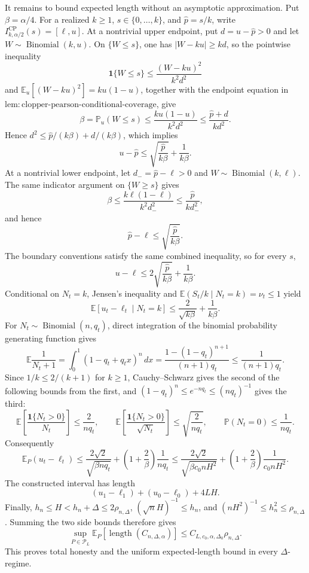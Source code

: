 It remains to bound expected length without an asymptotic approximation.  Put \(\beta=\alpha/4\).  For a realized \(k\geq1\), \(s\in\{0,\ldots,k\}\), and \(\widehat p=s/k\), write \(I^{\mathrm{CP}}_{k,\alpha/2}(s)=[\ell,u]\).  At a nontrivial upper endpoint, put \(d=u-\widehat p>0\) and let \(W\sim\operatorname{Binomial}(k,u)\).  On \(\{W\leq s\}\), one has \(|W-ku|\geq kd\), so the pointwise inequality
\[
 \mathbf1\{W\leq s\}\leq\frac{(W-ku)^2}{k^2d^2}
\]
and \(\mathbb E_u[(W-ku)^2]=ku(1-u)\), together with the endpoint equation in \(\mathrm{lem:clopper\text{-}pearson\text{-}conditional\text{-}coverage}\), give
\[
 \beta=\mathbb P_u(W\leq s)
 \leq\frac{ku(1-u)}{k^2d^2}
 \leq\frac{\widehat p+d}{kd^2}.
\]
Hence \(d^2\leq\widehat p/(k\beta)+d/(k\beta)\), which implies
\[
 u-\widehat p\leq\sqrt{\frac{\widehat p}{k\beta}}+\frac1{k\beta}.
\]
At a nontrivial lower endpoint, let \(d_-=\widehat p-\ell>0\) and \(W\sim\operatorname{Binomial}(k,\ell)\).  The same indicator argument on \(\{W\geq s\}\) gives
\[
 \beta\leq\frac{k\ell(1-\ell)}{k^2d_-^2}
 \leq\frac{\widehat p}{kd_-^2},
\]
and hence
\[
 \widehat p-\ell\leq\sqrt{\frac{\widehat p}{k\beta}}.
\]
The boundary conventions satisfy the same combined inequality, so for every \(s\),
\[
 u-\ell\leq2\sqrt{\frac{\widehat p}{k\beta}}+\frac1{k\beta}.
\]
Conditional on \(N_t=k\), Jensen's inequality and \(\mathbb E(S_t/k\mid N_t=k)=\nu_t\leq1\) yield
\[
 \mathbb E[u_t-\ell_t\mid N_t=k]
 \leq\frac2{\sqrt{k\beta}}+\frac1{k\beta}.
\]
For \(N_t\sim\operatorname{Binomial}(n,q_t)\), direct integration of the binomial probability generating function gives
\[
 \mathbb E\frac1{N_t+1}
 =\int_0^1(1-q_t+q_tx)^n\,dx
 =\frac{1-(1-q_t)^{n+1}}{(n+1)q_t}
 \leq\frac1{(n+1)q_t}.
\]
Since \(1/k\leq2/(k+1)\) for \(k\geq1\), Cauchy--Schwarz gives the second of the following bounds from the first, and \((1-q_t)^n\leq e^{-nq_t}\leq(nq_t)^{-1}\) gives the third:
\[
 \mathbb E\!\left[\frac{\mathbf1\{N_t>0\}}{N_t}\right]\leq\frac2{nq_t},
 \qquad
 \mathbb E\!\left[\frac{\mathbf1\{N_t>0\}}{\sqrt{N_t}}\right]\leq\sqrt{\frac2{nq_t}},
 \qquad
 \mathbb P(N_t=0)\leq\frac1{nq_t}.
\]
Consequently
\[
 \mathbb E_P(u_t-\ell_t)
 \leq\frac{2\sqrt2}{\sqrt{\beta nq_t}}
 +\left(1+\frac2\beta\right)\frac1{nq_t}
 \leq\frac{2\sqrt2}{\sqrt{\beta c_0nH^2}}
 +\left(1+\frac2\beta\right)\frac1{c_0nH^2}.
\]
The constructed interval has length
\[
 (u_1-\ell_1)+(u_0-\ell_0)+4LH.
\]
Finally, \(h_n\leq H<h_n+\Delta\leq2\rho_{n,\Delta}\), \((\sqrt nH)^{-1}\leq h_n\), and \((nH^2)^{-1}\leq h_n^2\leq\rho_{n,\Delta}\).  Summing the two side bounds therefore gives
\[
 \sup_{P\in\mathcal P_L}\mathbb E_P[\operatorname{length}(C_{n,\Delta,\alpha})]
 \leq C_{L,c_0,\alpha,\Delta_0}\rho_{n,\Delta}.
\]
This proves total honesty and the uniform expected-length bound in every \(\Delta\)-regime.